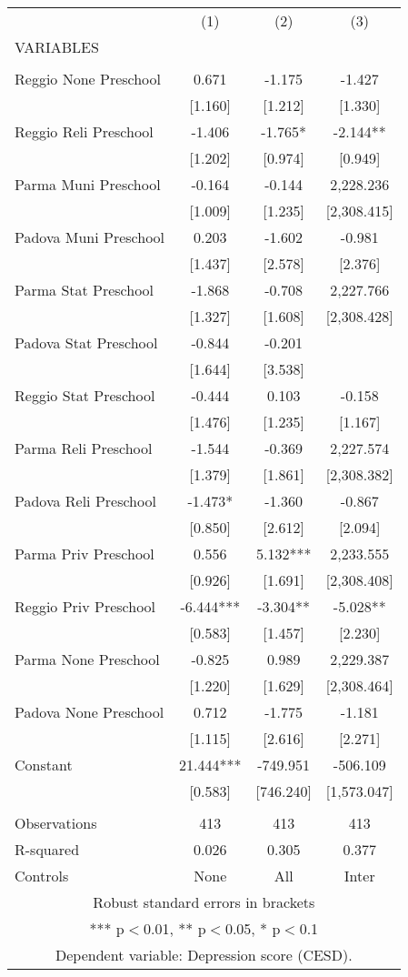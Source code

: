 \begin{tabular}{lccc} \hline
 & (1) & (2) & (3) \\
VARIABLES &  &  &  \\ \hline
 &  &  &  \\
Reggio None Preschool & 0.671 & -1.175 & -1.427 \\
 & [1.160] & [1.212] & [1.330] \\
Reggio Reli Preschool & -1.406 & -1.765* & -2.144** \\
 & [1.202] & [0.974] & [0.949] \\
Parma Muni Preschool & -0.164 & -0.144 & 2,228.236 \\
 & [1.009] & [1.235] & [2,308.415] \\
Padova Muni Preschool & 0.203 & -1.602 & -0.981 \\
 & [1.437] & [2.578] & [2.376] \\
Parma Stat Preschool & -1.868 & -0.708 & 2,227.766 \\
 & [1.327] & [1.608] & [2,308.428] \\
Padova Stat Preschool & -0.844 & -0.201 &  \\
 & [1.644] & [3.538] &  \\
Reggio Stat Preschool & -0.444 & 0.103 & -0.158 \\
 & [1.476] & [1.235] & [1.167] \\
Parma Reli Preschool & -1.544 & -0.369 & 2,227.574 \\
 & [1.379] & [1.861] & [2,308.382] \\
Padova Reli Preschool & -1.473* & -1.360 & -0.867 \\
 & [0.850] & [2.612] & [2.094] \\
Parma Priv Preschool & 0.556 & 5.132*** & 2,233.555 \\
 & [0.926] & [1.691] & [2,308.408] \\
Reggio Priv Preschool & -6.444*** & -3.304** & -5.028** \\
 & [0.583] & [1.457] & [2.230] \\
Parma None Preschool & -0.825 & 0.989 & 2,229.387 \\
 & [1.220] & [1.629] & [2,308.464] \\
Padova None Preschool & 0.712 & -1.775 & -1.181 \\
 & [1.115] & [2.616] & [2.271] \\
Constant & 21.444*** & -749.951 & -506.109 \\
 & [0.583] & [746.240] & [1,573.047] \\
 &  &  &  \\
Observations & 413 & 413 & 413 \\
R-squared & 0.026 & 0.305 & 0.377 \\
 Controls & None & All & Inter \\ \hline
\multicolumn{4}{c}{ Robust standard errors in brackets} \\
\multicolumn{4}{c}{ *** p$<$0.01, ** p$<$0.05, * p$<$0.1} \\
\multicolumn{4}{c}{ Dependent variable: Depression score (CESD).} \\
\end{tabular}
